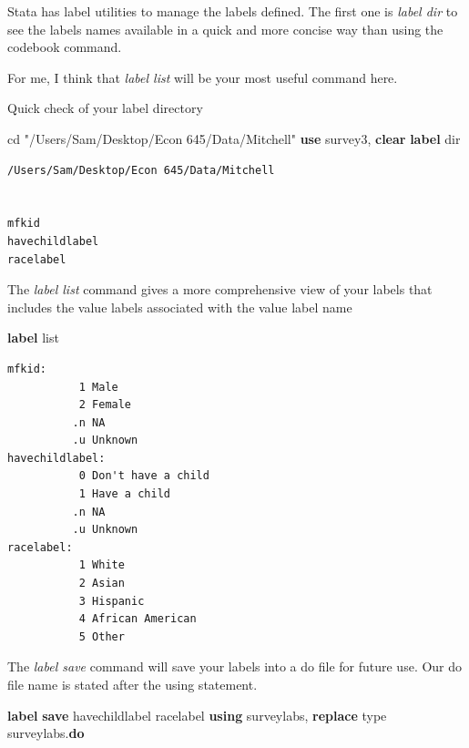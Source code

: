 \documentclass[
]{book}
\newenvironment{Shaded}{\begin{snugshade}}{\end{snugshade}}
\newcommand{\DecValTok}[1]{\textcolor[rgb]{0.00,0.00,0.81}{#1}}
\newcommand{\KeywordTok}[1]{\textcolor[rgb]{0.13,0.29,0.53}{\textbf{#1}}}
\newcommand{\NormalTok}[1]{#1}
\newcommand{\OtherTok}[1]{\textcolor[rgb]{0.56,0.35,0.01}{#1}}
\newcommand{\StringTok}[1]{\textcolor[rgb]{0.31,0.60,0.02}{#1}}
\begin{document}
Stata has label utilities to manage the labels defined. The first one is \emph{label dir} to see the labels names available in a quick and more concise way than using the codebook command.

For me, I think that \emph{label list} will be your most useful command here.

Quick check of your label directory

\begin{Shaded}
\begin{Highlighting}[]
\NormalTok{cd }\StringTok{"/Users/Sam/Desktop/Econ 645/Data/Mitchell"}
\KeywordTok{use}\NormalTok{ survey3, }\KeywordTok{clear}
\KeywordTok{label} \OtherTok{dir}
\end{Highlighting}
\end{Shaded}

\begin{verbatim}
/Users/Sam/Desktop/Econ 645/Data/Mitchell


mfkid
havechildlabel
racelabel
\end{verbatim}

The \emph{label list} command gives a more comprehensive view of your labels that includes the value labels associated with the value label name

\begin{Shaded}
\begin{Highlighting}[]
\KeywordTok{label} \OtherTok{list}
\end{Highlighting}
\end{Shaded}

\begin{verbatim}
mfkid:
           1 Male
           2 Female
          .n NA
          .u Unknown
havechildlabel:
           0 Don't have a child
           1 Have a child
          .n NA
          .u Unknown
racelabel:
           1 White
           2 Asian
           3 Hispanic
           4 African American
           5 Other
\end{verbatim}

The \emph{label save} command will save your labels into a do file for future use. Our do file name is stated after the using statement.

\begin{Shaded}
\begin{Highlighting}[]
\KeywordTok{label} \KeywordTok{save}\NormalTok{ havechildlabel racelabel }\KeywordTok{using}\NormalTok{ surveylabs, }\KeywordTok{replace}
\DecValTok{type}\NormalTok{ surveylabs.}\KeywordTok{do}
\end{Highlighting}
\end{Shaded}
\end{document}
